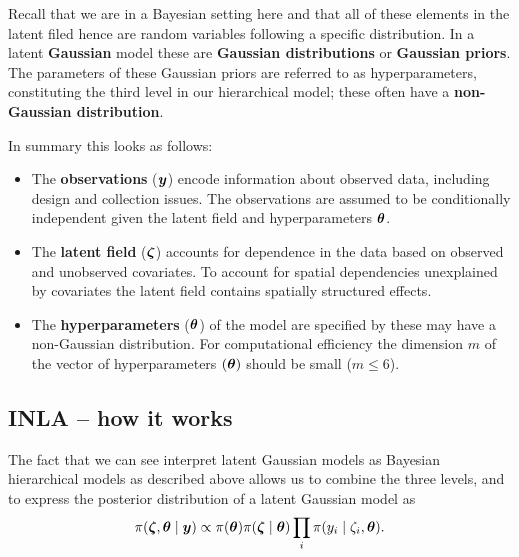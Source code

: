 Recall that we are in a Bayesian setting here and that all of these elements in the latent filed hence are random variables following a specific distribution. In a latent \textbf{Gaussian} model these are \textbf{Gaussian distributions} or \textbf{Gaussian priors}. The parameters of these Gaussian priors are referred to as hyperparameters, constituting the third level in our hierarchical model; these often have a \textbf{non-Gaussian distribution}. 

\vspace{0.3cm}
In summary this looks as follows:
\begin{itemize}
\item The {\bf observations} ($\boldsymbol{y}$) encode information about observed data, including design and collection issues. The  observations are assumed to be conditionally independent given the latent field and hyperparameters $\boldsymbol{\theta}$. 
\item The {\bf latent field} ($\boldsymbol{\zeta}$) accounts for dependence in the data based on observed and unobserved covariates. To account for spatial dependencies unexplained by covariates the latent field contains spatially structured effects. 

\item The {\bf hyperparameters} ($\boldsymbol{\theta}$) of the model are specified by
these may have a non-Gaussian distribution. For computational efficiency the dimension $m$ of the vector of hyperparameters $(\boldsymbol{\theta})$ should be small ($ m \leq 6$).
\end{itemize}


\subsection{INLA -- how it works}\label{INLAhow:heur}

The fact that we can see interpret latent Gaussian models as Bayesian hierarchical models as described above allows us to combine the three levels, and to express the posterior distribution of a latent Gaussian model as
\begin{equation*}
\pi(\boldsymbol{\zeta},\boldsymbol{\theta}\mid \boldsymbol{y})\propto \pi( \boldsymbol{\theta}) \pi(\boldsymbol{\zeta}\mid \boldsymbol{\theta}) \prod_{i}\pi(y_i\mid \zeta_i , \boldsymbol{\theta}).
\end{equation*}

